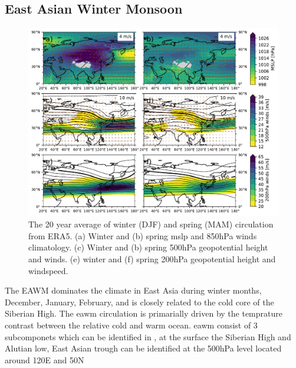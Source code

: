 \subsection{East Asian Winter Monsoon}
\begin{figure}[htpb]
    \centering
    \includegraphics[width=\textwidth]{texfiles/figs/climatology_1999-2019.pdf}
    \caption{The 20 year average of winter (DJF)  and spring (MAM) circulation from ERA5. (a) Winter and (b) spring \acrshort{mslp} and 850hPa winds climatology. (c) Winter and (b) spring 500hPa geopotential height and winds. (e) winter and (f) spring 200hPa geopotential height and windspeed.}
    \label{fig:clim_circulation}
\end{figure}
The EAWM dominates the climate in East Asia during winter months, December, January, February, and is closely related to the cold core of the Siberian High. The \acrshort{eawm} circulation is primarially driven by the temprature contrast between the relative cold and warm ocean. \acrshort{eawm} consist of 3 subcomponets which can be identified in , at the surface the Siberian High and Alutian low, East Asian trough can be identified at the 500hPa level located around 120\degree E and 50\degree N  
